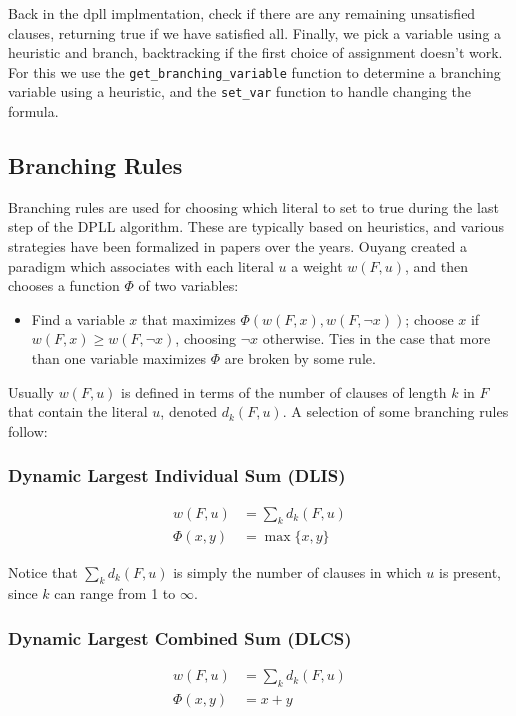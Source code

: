 \documentclass[10pt,AMS Euler]{article}
\begin{document}
Back in the dpll implmentation, check if there are any remaining unsatisfied
clauses, returning true if we have satisfied all. Finally, we pick a
variable using a heuristic and branch, backtracking if the first choice of
assignment doesn't work. For this we use the \texttt{get\_branching\_variable} function
to determine a branching variable using a heuristic, and the \texttt{set\_var}
function to handle changing the formula.

\subsection*{Branching Rules}
\label{sec:orgaa737ff}
Branching rules are used for choosing which literal to set to true during
the last step of the DPLL algorithm. These are typically based on heuristics,
and various strategies have been formalized in papers over the years.
Ouyang \cite{ouyang} created a paradigm which associates with each literal \(u\) a weight \(w(F, u)\),
and then chooses a function \(\Phi\) of two variables:
\begin{itemize}
\item Find a variable \(x\) that maximizes \(\Phi(w(F,x), w(F, \neg x))\); choose \(x\) if
\(w(F, x) \geq w(F,\neg x)\), choosing \(\neg x\) otherwise. Ties in the case that more
than one variable maximizes \(\Phi\) are broken by some rule.
\end{itemize}

Usually \(w(F,u)\) is defined in terms of the number of clauses of length \(k\) in \(F\) that contain the
literal \(u\), denoted \(d_k(F, u)\). A selection of some branching rules follow:
\subsubsection*{Dynamic Largest Individual Sum (DLIS)}
\label{sec:orgbc7957d}
\begin{align*}
w(F,u) &= \sum_k d_k(F,u) \\
\Phi(x,y) &= \max\{x,y\}
\end{align*}

Notice that \(\sum_k d_k(F,u)\) is simply the number of clauses in which \(u\) is present,
since \(k\) can range from 1 to \(\infty\).
\subsubsection*{Dynamic Largest Combined Sum (DLCS)}
\label{sec:org9762a82}
\begin{align*}
w(F,u) &= \sum_k d_k(F,u) \\
\Phi(x,y) &= x + y
\end{align*}
\end{document}
